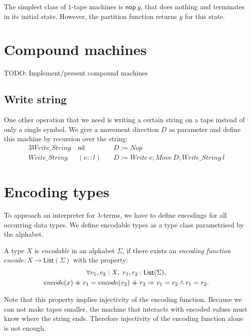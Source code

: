 \documentclass{psartcl}
\newcommand{\MS}[1]{\textsf{#1}}
\newcommand{\nil}{\MS{nil}}
\newcommand{\cons}{\mathbin{::}}
\newcommand\mdoubleplus{\ensuremath{\mathbin{+\mkern-10mu+}}}
\newcommand{\app}{\mdoubleplus}
\newcommand{\from}{:}
\renewcommand{\to}{\rightarrow}
\newcommand{\List}{\MS{List}}
\newcommand{\mseq}{\mathbin{;}}
\begin{document}
The simplest class of $1$-tape machines is $\MS{nop}~y$, that does nothing and terminates in its initial state.  However, the partition function
returns $y$ for this state.

\section{Compound machines}

TODO: Implement/present compound machines

\subsection{Write string}

One other operation that we need is writing a certain string on a tape instead of only a single symbol.  We give a movement direction $D$ as
parameter and define this machine by recursion over the string:
\begin{alignat*}{3}
  Write\_String&~\nil       ~&& D := Nop \\
  Write\_String&~(e \cons l)~&& D := Write~e \mseq Move~D \mseq Write\_String~l
\end{alignat*}


\section{Encoding types}
\label{sec:encode}

To approach an interpreter for $\lambda$-terms, we have to define encodings for all occurring data types.
We define encodable types as a type class parametrised by the alphabet.

\begin{definition}
  \label{def:code}
  A type $X$ is \emph{encodable} in an alphabet $\Sigma$, if there exists an \emph{encoding function}
  $encode \from X \to \List(\Sigma)$ with the property:
  \begin{multline*}
    \forall v_1,v_2:X,~r_1,r_2:\List(\Sigma), \\
    encode(x) \app r_1 = encode(v_2) \app r_2 \Rightarrow
    v_1 = v_2 \land r_1 = r_2.
  \end{multline*}
\end{definition}
Note that this property implies injectivity of the encoding function.  Because we can not make tapes smaller, the machine that interacts with encoded
values must know where the string ends.  Therefore injectivity of the encoding function alone is not enough.
\end{document}
